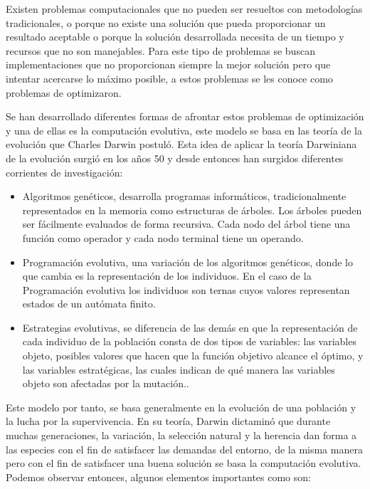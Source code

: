 Existen problemas computacionales que no pueden ser resueltos con metodologías tradicionales, o porque no existe una solución que pueda proporcionar un resultado aceptable o porque la solución desarrollada necesita de un tiempo y recursos que no son manejables. Para este tipo de problemas se buscan implementaciones que no proporcionan siempre la mejor soluci\'on pero que intentar acercarse lo máximo posible, a estos problemas se les conoce como problemas de optimizaron.

Se han desarrollado diferentes formas de afrontar estos problemas de optimizaci\'on y una de ellas es la computación evolutiva, este modelo se basa en las teoría de la evolución que Charles Darwin postul\'o. Esta idea de aplicar la teor\'ia Darwiniana de la evolución surgió en los a\~nos 50 y desde entonces han surgidos diferentes corrientes de investigación:

\begin{itemize}
	\item Algoritmos genéticos, desarrolla programas informáticos, tradicionalmente representados en la memoria como estructuras de árboles. Los árboles pueden ser fácilmente evaluados de forma recursiva. Cada nodo del árbol tiene una función como operador y cada nodo terminal tiene un operando.
	\item Programación evolutiva, una variación de los algoritmos genéticos, donde lo que cambia es la representación de los individuos. En el caso de la Programación evolutiva los individuos son ternas cuyos valores representan estados de un autómata finito. 
	\item Estrategias evolutivas, se diferencia de las demás en que la representación de cada individuo de la población consta de dos tipos de variables: las variables objeto, posibles valores que hacen que la función objetivo alcance el óptimo, y las variables estratégicas, las cuales indican de qué manera las variables objeto son afectadas por la mutación.. 
\end{itemize}

Este modelo por tanto, se basa generalmente en la evolución de una población y la lucha por la supervivencia. En su teoría, Darwin dictamin\'o que durante muchas generaciones, la variación, la selección natural y la herencia dan forma a las especies con el fin de satisfacer las demandas del entorno, de la misma manera pero con el fin de satisfacer una buena solución se basa la computación evolutiva. Podemos observar entonces, algunos elementos importantes como son:

